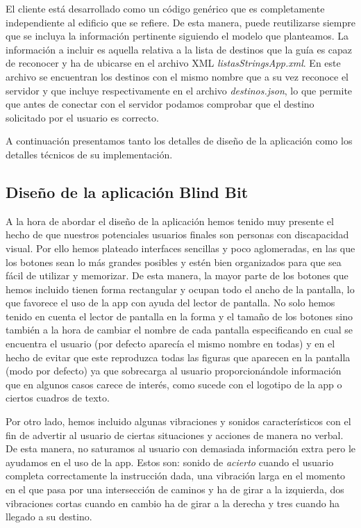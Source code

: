 El cliente está desarrollado como un código genérico que es completamente independiente al edificio que se refiere. De esta manera, puede reutilizarse siempre que se incluya la información pertinente siguiendo el modelo que planteamos. La información a incluir es aquella relativa a la lista de destinos que la guía es capaz de reconocer y ha de ubicarse en el archivo XML \textit{listasStringsApp.xml}. En este archivo se encuentran los destinos con el mismo nombre que a su vez reconoce el servidor y que incluye respectivamente en el archivo \textit{destinos.json}, lo que permite que antes de conectar con el servidor podamos comprobar que el destino solicitado por el usuario es correcto. %

A continuación presentamos tanto los detalles de diseño de la aplicación como los detalles técnicos de su implementación.

\subsection{Diseño de la aplicación Blind Bit}
\label{sub:diseño}

A la hora de abordar el diseño de la aplicación hemos tenido muy presente el hecho de que nuestros potenciales usuarios finales son personas con discapacidad visual. Por ello hemos plateado interfaces sencillas y poco aglomeradas, en las que los botones sean lo más grandes posibles y estén bien organizados para que sea fácil de utilizar y memorizar. De esta manera, la mayor parte de los botones que hemos incluido tienen forma rectangular y ocupan todo el ancho de la pantalla, lo que favorece el uso de la app con ayuda del lector de pantalla. No solo hemos tenido en cuenta el lector de pantalla en la forma y el tamaño de los botones sino también a la hora de cambiar el nombre de cada pantalla especificando en cual se encuentra el usuario (por defecto aparecía el mismo nombre en todas) y en el hecho de evitar que este reproduzca todas las figuras que aparecen en la pantalla (modo por defecto) ya que sobrecarga al usuario proporcionándole información que en algunos casos carece de interés, como sucede con el logotipo de la app o ciertos cuadros de texto.

Por otro lado, hemos incluido algunas vibraciones y sonidos característicos con el fin de advertir al usuario de ciertas situaciones y acciones de manera no verbal. De esta manera, no saturamos al usuario con demasiada información extra pero le ayudamos en el uso de la app. Estos son: sonido de \textit{acierto} cuando el usuario completa correctamente la instrucción dada, una vibración larga en el momento en el que pasa por una intersección de caminos y ha de girar a la izquierda, dos vibraciones cortas cuando en cambio ha de girar a la derecha y tres cuando ha llegado a su destino.

